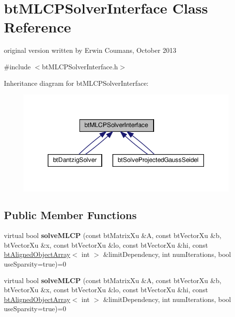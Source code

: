 \hypertarget{classbtMLCPSolverInterface}{}\section{bt\+M\+L\+C\+P\+Solver\+Interface Class Reference}
\label{classbtMLCPSolverInterface}


original version written by Erwin Coumans, October 2013  




{\ttfamily \#include $<$bt\+M\+L\+C\+P\+Solver\+Interface.\+h$>$}



Inheritance diagram for bt\+M\+L\+C\+P\+Solver\+Interface\+:
\nopagebreak
\begin{figure}[H]
\begin{center}
\leavevmode
\includegraphics[width=330pt]{classbtMLCPSolverInterface__inherit__graph}
\end{center}
\end{figure}
\subsection*{Public Member Functions}
\begin{DoxyCompactItemize}
\item 
\mbox{\label{classbtMLCPSolverInterface_a9529ab6fb462ddc58582a8647af67e2c}} 
virtual bool {\bfseries solve\+M\+L\+CP} (const bt\+Matrix\+Xu \&A, const bt\+Vector\+Xu \&b, bt\+Vector\+Xu \&x, const bt\+Vector\+Xu \&lo, const bt\+Vector\+Xu \&hi, const \hyperlink{classbtAlignedObjectArray}{bt\+Aligned\+Object\+Array}$<$ int $>$ \&limit\+Dependency, int num\+Iterations, bool use\+Sparsity=true)=0
\item 
\mbox{\label{classbtMLCPSolverInterface_a9529ab6fb462ddc58582a8647af67e2c}} 
virtual bool {\bfseries solve\+M\+L\+CP} (const bt\+Matrix\+Xu \&A, const bt\+Vector\+Xu \&b, bt\+Vector\+Xu \&x, const bt\+Vector\+Xu \&lo, const bt\+Vector\+Xu \&hi, const \hyperlink{classbtAlignedObjectArray}{bt\+Aligned\+Object\+Array}$<$ int $>$ \&limit\+Dependency, int num\+Iterations, bool use\+Sparsity=true)=0
\end{DoxyCompactItemize}


